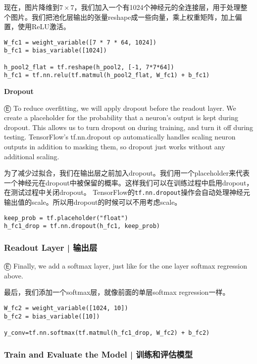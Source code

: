 现在，图片降维到$7\times7$，我们加入一个有1024个神经元的全连接层，用于处理整个图片。我们把池化层输出的张量reshape成一些向量，乘上权重矩阵，加上偏置，使用ReLU激活。

\begin{lstlisting}
W_fc1 = weight_variable([7 * 7 * 64, 1024])
b_fc1 = bias_variable([1024])

h_pool2_flat = tf.reshape(h_pool2, [-1, 7*7*64])
h_fc1 = tf.nn.relu(tf.matmul(h_pool2_flat, W_fc1) + b_fc1)
\end{lstlisting}

\textbf{Dropout}

Ⓔ \textcolor{etc}{To reduce overfitting, we will apply dropout before the readout layer. We create a placeholder for the probability that a neuron's output is kept during dropout. This allows us to turn dropout on during training, and turn it off during testing. TensorFlow's tf.nn.dropout op automatically handles scaling neuron outputs in addition to masking them, so dropout just works without any additional scaling.}

为了减少过拟合，我们在输出层之前加入dropout。我们用一个placeholder来代表一个神经元在dropout中被保留的概率。这样我们可以在训练过程中启用dropout，在测试过程中关闭dropout。 TensorFlow的\lstinline{tf.nn.dropout}操作会自动处理神经元输出值的scale。所以用dropout的时候可以不用考虑scale。

\begin{lstlisting}
keep_prob = tf.placeholder("float")
h_fc1_drop = tf.nn.dropout(h_fc1, keep_prob)
\end{lstlisting}

%
\subsubsection{Readout Layer  |  输出层}

Ⓔ \textcolor{etc}{Finally, we add a softmax layer, just like for the one layer softmax regression above.}

最后，我们添加一个softmax层，就像前面的单层softmax regression一样。

\begin{lstlisting}
W_fc2 = weight_variable([1024, 10])
b_fc2 = bias_variable([10])

y_conv=tf.nn.softmax(tf.matmul(h_fc1_drop, W_fc2) + b_fc2)
\end{lstlisting}

%
\subsubsection{Train and Evaluate the Model  |  训练和评估模型}

